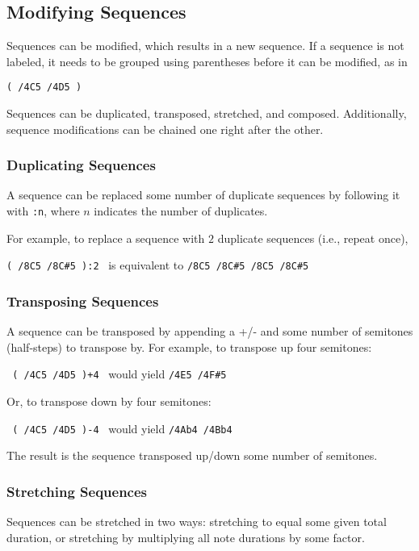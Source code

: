 \documentclass{scrartcl}
\begin{document}
\subsection{Modifying Sequences}
Sequences can be modified, which results in a new sequence. If a sequence is not labeled, it needs to be grouped using parentheses before it can be modified, as in 
\begin{center}
\verb|( /4C5 /4D5 )|
\end{center}

Sequences can be duplicated, transposed, stretched, and composed. Additionally, sequence modifications can be chained one right after the other.

\subsubsection{Duplicating Sequences}
A sequence can be replaced some number of duplicate sequences by following it with \verb|:n|, where $n$ indicates the number of duplicates.

For example, to replace a sequence with $2$ duplicate sequences (i.e., repeat once),
\begin{center}
\verb|( /8C5 /8C#5 ):2| \ is equivalent to \verb|/8C5 /8C#5 /8C5 /8C#5|
\end{center}

\subsubsection{Transposing Sequences}
A sequence can be transposed by appending a +/- and some number of semitones (half-steps) to transpose by. For example, to transpose up four semitones:
\begin{center}
\verb| ( /4C5 /4D5 )+4| \ would yield \verb|/4E5 /4F#5|
\end{center}

Or, to transpose down by four semitones: 
\begin{center}
\verb| ( /4C5 /4D5 )-4| \ would yield \verb|/4Ab4 /4Bb4|
\end{center}
The result is the sequence transposed up/down some number of semitones.

\subsubsection{Stretching Sequences}
Sequences can be stretched in two ways: stretching to equal some given total duration, or stretching by multiplying all note durations by some factor.
\end{document}
